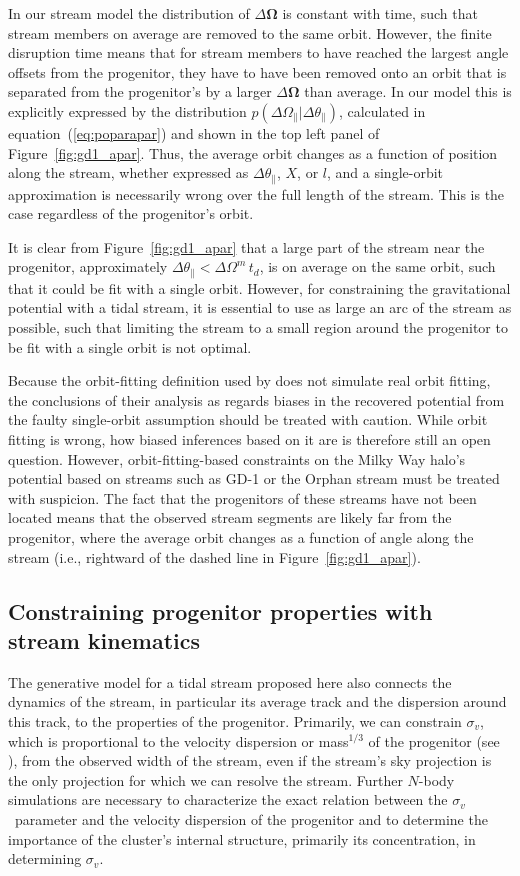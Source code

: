 \documentclass{emulateapj}
\newcommand{\ie}{i.e.}
\newcommand{\eqnname}{equation}
\newcommand{\equationname}{\eqnname}
\renewcommand{\figurename}{Figure}
\renewcommand{\vec}[1]{\ensuremath{\mathbf{#1}}}
\newcommand{\veco}{\ensuremath{\vec{\Omega}}}
\newcommand{\sigv}{\ensuremath{\sigma_v}}
\newcommand{\apar}{\ensuremath{\theta_\parallel}}
\newcommand{\opar}{\ensuremath{\Omega_\parallel}}
\begin{document}
In our stream model the distribution of $\Delta \veco$ is constant
with time, such that stream members on average are removed to the same
orbit. However, the finite disruption time means that for stream
members to have reached the largest angle offsets from the progenitor,
they have to have been removed onto an orbit that is separated from
the progenitor's by a larger $\Delta \veco$ than average. In our model
this is explicitly expressed by the distribution $p(\Delta
\opar|\Delta \apar)$, calculated in \equationname~(\ref{eq:poparapar})
and shown in the top left panel of
\figurename~\ref{fig:gd1_apar}. Thus, the average orbit changes as a
function of position along the stream, whether expressed as $\Delta
\apar$, $X$, or $l$, and a single-orbit approximation is necessarily
wrong over the full length of the stream. This is the case regardless
of the progenitor's orbit.

It is clear from \figurename~\ref{fig:gd1_apar} that a large part of
the stream near the progenitor, approximately $\Delta \apar < \Delta
\Omega^m\,t_d$, is on average on the same orbit, such that it could be
fit with a single orbit. However, for constraining the gravitational
potential with a tidal stream, it is essential to use as large an arc
of the stream as possible, such that limiting the stream to a small
region around the progenitor to be fit with a single orbit is not
optimal.

Because the orbit-fitting definition used by \citet{Sanders13a} does
not simulate real orbit fitting, the conclusions of their analysis as
regards biases in the recovered potential from the faulty single-orbit
assumption should be treated with caution. While orbit fitting is
wrong, how biased inferences based on it are is therefore still an
open question. However, orbit-fitting-based constraints on the Milky
Way halo's potential based on streams such as GD-1 or the Orphan
stream must be treated with suspicion. The fact that the progenitors
of these streams have not been located means that the observed stream
segments are likely far from the progenitor, where the average orbit
changes as a function of angle along the stream (\ie, rightward of the
dashed line in \figurename~\ref{fig:gd1_apar}).


\subsection{Constraining progenitor properties with stream kinematics}

The generative model for a tidal stream proposed here also connects
the dynamics of the stream, in particular its average track and the
dispersion around this track, to the properties of the
progenitor. Primarily, we can constrain $\sigv$, which is proportional
to the velocity dispersion or mass$^{1/3}$ of the progenitor (see
\citealt{Sanders13a}), from the observed width of the stream, even if
the stream's sky projection is the only projection for which we can
resolve the stream. Further $N$-body simulations are necessary to
characterize the exact relation between the \sigv\ parameter and the
velocity dispersion of the progenitor and to determine the importance
of the cluster's internal structure, primarily its concentration, in
determining \sigv.
\end{document}
